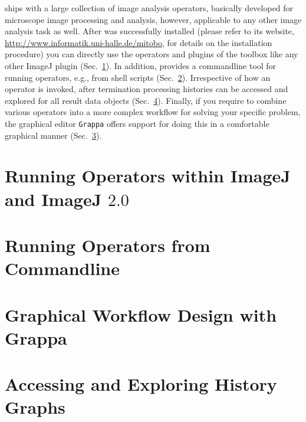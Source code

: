 \mitobo ships with a large collection of image analysis operators, basically developed for
microscope image processing and analysis, however, applicable to any other image analysis
task as well. After \mitobo was successfully installed (please refer to its
website, \href{http://www.informatik.uni-halle.de/mitobo}{http://www.informatik.uni-halle.de/mitobo}, for details
on the installation procedure) you can directly use the operators and plugins of the toolbox like any other ImageJ plugin 
(Sec.~\ref{sec:opRunImageJ}). In addition, \mitobo provides a commandline tool for running operators, e.g., from shell scripts
(Sec.~\ref{sec:opRunCmdline}). 
Irrespective of how an operator is invoked, after termination processing histories can be accessed and explored for all result 
data objects (Sec.~\ref{sec:history}). 
Finally, if you require to combine various operators into a more complex workflow for solving your specific problem, the graphical 
editor {\tt Grappa} offers support for doing this in a comfortable graphical manner (Sec.~\ref{sec:grappa}).

\section{Running Operators within ImageJ and ImageJ $2.0$}

\label{sec:opRunImageJ}

\section{Running Operators from Commandline}

\label{sec:opRunCmdline}

\section{Graphical Workflow Design with Grappa}

\label{sec:grappa}

\section{Accessing and Exploring History Graphs}

\label{sec:history}

